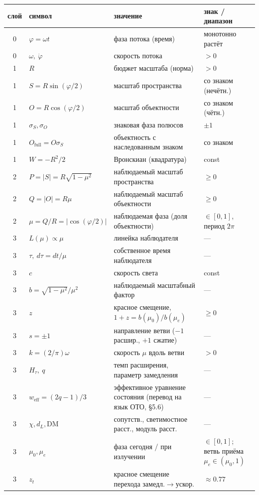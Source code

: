 \documentclass{article}
\begin{document}
\begin{center}
\footnotesize
\setlength{\tabcolsep}{4pt}
\begin{tabularx}{\textwidth}{@{}c l >{\raggedright\arraybackslash}X >{\raggedright\arraybackslash}X@{}}
\toprule
\textbf{слой} & \textbf{символ} & \textbf{значение} & \textbf{знак / диапазон} \\
\midrule
0 & $\varphi = \omega t$ & фаза потока (время) & монотонно растёт \\
0 & $\omega,\ \dot{\varphi}$ & скорость потока & $> 0$ \\
1 & $R$ & бюджет масштаба (норма) & $> 0$ \\
1 & $S = R\sin(\varphi/2)$ & масштаб пространства & со знаком (нечётн.) \\
1 & $O = R\cos(\varphi/2)$ & масштаб объектности & со знаком (чётн.) \\
1 & $\sigma_S, \sigma_O$ & знаковая фаза полюсов & $\pm 1$ \\
1 & $O_{\text{full}} = O\sigma_S$ & объектность с наследованным знаком & со знаком \\
1 & $W = -R^2/2$ & Вронскиан (квадратура) & const \\
2 & $P = |S| = R\sqrt{1-\mu^2}$ & наблюдаемый масштаб пространства & $\ge 0$ \\
2 & $Q = |O| = R\mu$ & наблюдаемый масштаб объектности & $\ge 0$ \\
2 & $\mu = Q/R = |\cos(\varphi/2)|$ & наблюдаемая фаза (доля объектности) & $\in [0,1]$, период $2\pi$ \\
3 & $L(\mu) \propto \mu$ & линейка наблюдателя & --- \\
3 & $\tau,\ d\tau = dt/\mu$ & собственное время наблюдателя & --- \\
3 & $c$ & скорость света & const \\
3 & $b = \sqrt{1-\mu^2}/\mu^2$ & наблюдаемый масштабный фактор & --- \\
3 & $z$ & красное смещение, $1+z = b(\mu_0)/b(\mu_e)$ & $\ge 0$ \\
3 & $s = \pm 1$ & направление ветви ($-1$ расшир., $+1$ сжатие) & --- \\
3 & $k = (2/\pi)\omega$ & скорость $\mu$ вдоль ветви & $> 0$ \\
3 & $H_\tau,\ q$ & темп расширения, параметр замедления & --- \\
3 & $w_{\text{eff}} = (2q-1)/3$ & эффективное уравнение состояния (перевод на язык ОТО, \S5.6) & --- \\
3 & $\chi, d_L, \text{DM}$ & сопутств., светимостное расст., модуль расст. & --- \\
3 & $\mu_0, \mu_e$ & фаза сегодня / при излучении & $\in [0,1]$; ветвь приёма $\mu_e \in (\mu_0, 1)$ \\
3 & $z_t$ & красное смещение перехода замедл.$\to$ускор. & $\approx 0.77$ \\
\bottomrule
\end{tabularx}
\end{center}
\end{document}
